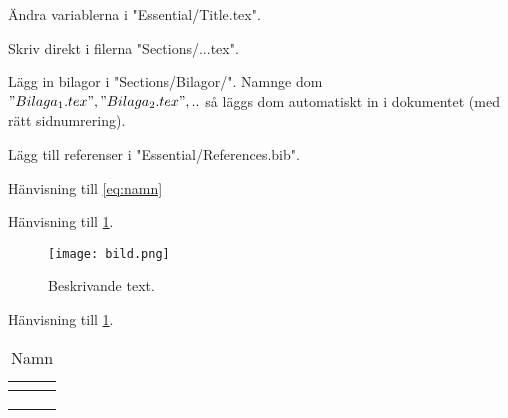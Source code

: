 Ändra variablerna i "Essential/Title.tex".

Skriv direkt i filerna "Sections/...tex".

Lägg in bilagor i "Sections/Bilagor/".
Namnge dom $"Bilaga_1.tex", "Bilaga_2.tex",..$ så läggs dom automatiskt in i dokumentet (med rätt sidnumrering).

Lägg till referenser i "Essential/References.bib".



Hänvisning till \cref{eq:namn}
\begin{equation} \label{eq:namn}
\end{equation}


Hänvisning till \cref{fig:namn}.
\begin{figure} [H]
    \centering 
    \texttt{[image: bild.png]}
    \caption{Beskrivande text.}
    \label{fig:namn}
\end{figure}


Hänvisning till \cref{tab:namn}.
\begin{table}[H]
\centering
\caption{Namn} \label{tab:namn}
\begin{tabular}{@{} l l l @{}} \toprule
\textbf{} & \textbf{} & \textbf{} \\
\midrule
     &  &  \\
     &  &  \\
     &  &  \\
\bottomrule
\end{tabular}
\end{table}



